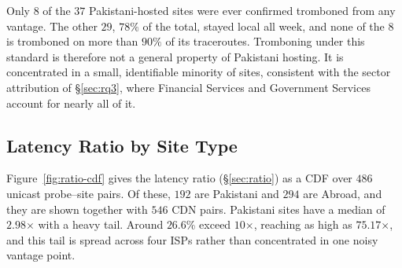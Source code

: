 \documentclass[sigconf,anonymous,10pt]{acmart}
\begin{document}
Only $8$ of the $37$ Pakistani-hosted sites were ever confirmed tromboned from any vantage. The other $29$, $78\%$ of the total, stayed local all week, and none of the $8$ is tromboned on more than $90\%$ of its traceroutes. Tromboning under this standard is therefore not a general property of Pakistani hosting. It is concentrated in a small, identifiable minority of sites, consistent with the sector attribution of \S\ref{sec:rq3}, where Financial Services and Government Services account for nearly all of it.



 
\subsection{Latency Ratio by Site Type}
\label{sec:prelim-ratio}
Figure~\ref{fig:ratio-cdf} gives the latency ratio (\S\ref{sec:ratio}) as a CDF over $486$ unicast probe--site pairs. Of these, $192$ are Pakistani and $294$ are Abroad, and they are shown together with $546$ CDN pairs. Pakistani sites have a median of $2.98$$\times$ with a heavy tail. Around $26.6$\% exceed $10$$\times$, reaching as high as $75.17$$\times$, and this tail is spread across four ISPs rather than concentrated in one noisy vantage point.
\end{document}
